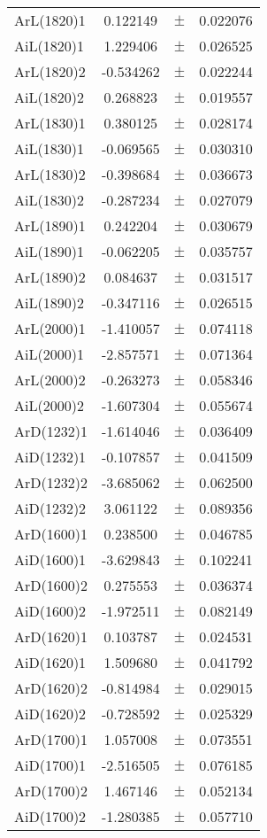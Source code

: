 \begin{table}
\begin{tiny}
\begin{tabular}{lccc}
ArL(1820)1 & 0.122149 & $\pm$ & 0.022076 \\
AiL(1820)1 & 1.229406 & $\pm$ & 0.026525 \\
ArL(1820)2 & -0.534262 & $\pm$ & 0.022244 \\
AiL(1820)2 & 0.268823 & $\pm$ & 0.019557 \\
ArL(1830)1 & 0.380125 & $\pm$ & 0.028174 \\
AiL(1830)1 & -0.069565 & $\pm$ & 0.030310 \\
ArL(1830)2 & -0.398684 & $\pm$ & 0.036673 \\
AiL(1830)2 & -0.287234 & $\pm$ & 0.027079 \\
ArL(1890)1 & 0.242204 & $\pm$ & 0.030679 \\
AiL(1890)1 & -0.062205 & $\pm$ & 0.035757 \\
ArL(1890)2 & 0.084637 & $\pm$ & 0.031517 \\
AiL(1890)2 & -0.347116 & $\pm$ & 0.026515 \\
ArL(2000)1 & -1.410057 & $\pm$ & 0.074118 \\
AiL(2000)1 & -2.857571 & $\pm$ & 0.071364 \\
ArL(2000)2 & -0.263273 & $\pm$ & 0.058346 \\
AiL(2000)2 & -1.607304 & $\pm$ & 0.055674 \\
ArD(1232)1 & -1.614046 & $\pm$ & 0.036409 \\
AiD(1232)1 & -0.107857 & $\pm$ & 0.041509 \\
ArD(1232)2 & -3.685062 & $\pm$ & 0.062500 \\
AiD(1232)2 & 3.061122 & $\pm$ & 0.089356 \\
ArD(1600)1 & 0.238500 & $\pm$ & 0.046785 \\
AiD(1600)1 & -3.629843 & $\pm$ & 0.102241 \\
ArD(1600)2 & 0.275553 & $\pm$ & 0.036374 \\
AiD(1600)2 & -1.972511 & $\pm$ & 0.082149 \\
ArD(1620)1 & 0.103787 & $\pm$ & 0.024531 \\
AiD(1620)1 & 1.509680 & $\pm$ & 0.041792 \\
ArD(1620)2 & -0.814984 & $\pm$ & 0.029015 \\
AiD(1620)2 & -0.728592 & $\pm$ & 0.025329 \\
ArD(1700)1 & 1.057008 & $\pm$ & 0.073551 \\
AiD(1700)1 & -2.516505 & $\pm$ & 0.076185 \\
ArD(1700)2 & 1.467146 & $\pm$ & 0.052134 \\
AiD(1700)2 & -1.280385 & $\pm$ & 0.057710 \\
\bottomrule
\end{tabular}
\end{tiny}
\end{table}

